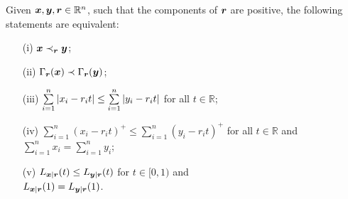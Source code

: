 \begin{proposition}\label{prop:rmajor}
Given $\bm{x}, \bm{y}, \boldsymbol{r} \in \mathbb{R}^n$, such that the components of $\boldsymbol{r}$ are positive, the following statements are equivalent:
  \begin{enumerate}
    \item[(i)] $\bm{x} \prec_{\boldsymbol{r}} \bm{y}$;
    \item[(ii)] $\Gamma_{\boldsymbol{r}}({\bm{x}}) \prec \Gamma_{\boldsymbol{r}}({\bm{y}})$;
    \item[(iii)]\label{en:tm3} $\sum\limits_{i=1}^n \abs{x_i - r_i t} \leq \sum\limits_{i=1}^n \abs{y_i - r_i t}$ for all $t \in \mathbb{R}$;
    \item[(iv)] $\sum\limits_{i=1}^n (x_i - r_i t)^+ \leq \sum\limits_{i=1}^n (y_i - r_i t)^+$ for all $t \in \mathbb{R}$ and \vspace{5pt}\\ $\sum\limits_{i=1}^n x_i = \sum\limits_{i=1}^n y_i$;
    \item[(v)] $L_{\bm{x}|\boldsymbol{r}}(t) \leq L_{\bm{y}|\boldsymbol{r}}(t)$ for $t\in [0,1)$ and \vspace{5pt}\\ $L_{\bm{x}|\boldsymbol{r}}(1) = L_{\bm{y}|\boldsymbol{r}}(1)$.
  \end{enumerate}
\end{proposition}
